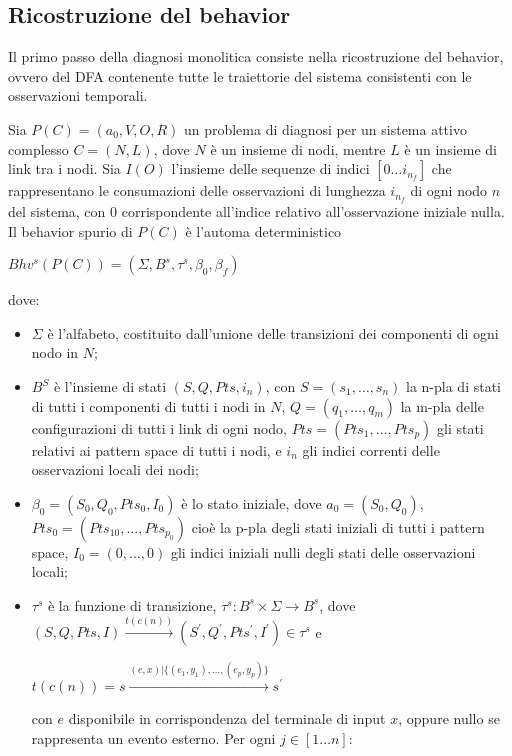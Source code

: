 \subsection{Ricostruzione del behavior}
Il primo passo della diagnosi monolitica consiste nella ricostruzione del behavior, ovvero del DFA contenente tutte le traiettorie del sistema consistenti con le osservazioni temporali.
\begin{defn}
Sia $P(C) = (a_0,V,O,R)$ un problema di diagnosi per un sistema attivo complesso $C = (N,L)$, dove $N$ è un insieme di nodi, mentre $L$ è un insieme di link tra i nodi. Sia $I(O)$ l'insieme delle sequenze di indici $[0 \ldots i_{n_f}]$ che rappresentano le consumazioni delle osservazioni di lunghezza $i_{n_f}$ di ogni nodo $n$ del sistema, con $0$ corrispondente all'indice relativo all'osservazione iniziale nulla. 
Il behavior spurio di $P(C)$ è l'automa deterministico
\begin{center}
	$Bhv^s(P(C)) = (\Sigma,B^s,\tau^s,\beta_0,\beta_f)$
\end{center}
dove:
\begin{itemize}
\item $\Sigma$ è l'alfabeto, costituito dall'unione delle transizioni dei componenti di ogni nodo in $N$;
\item $B^S$ è l'insieme di stati $(S,Q,Pts,i_n)$, con $S = (s_1,\ldots,s_n)$ la n-pla di stati di tutti i componenti di tutti i nodi in $N$, $Q = (q_1,\ldots,q_m)$ la m-pla delle configurazioni di tutti i link di ogni nodo, $Pts = (Pts_1,\ldots,Pts_p)$ gli stati relativi ai pattern space di tutti i nodi, e $i_n$ gli indici correnti delle osservazioni locali dei nodi;
\item $\beta_0 = (S_0,Q_0,Pts_0,I_0)$ è lo stato iniziale, dove $a_0 = (S_0,Q_0)$, $Pts_0 = (Pts_{10},\ldots,Pts_{p_0})$ cioè la p-pla degli stati iniziali di tutti i pattern space, $I_0 = (0,\ldots,0)$ gli indici iniziali nulli degli stati delle osservazioni locali;
\item $\tau^s$ è la funzione di transizione, $\tau^s: B^s \times \Sigma \rightarrow B^s$, dove $(S,Q,Pts,I) \xrightarrow{t(c(n))} (S^\prime,Q^\prime,Pts^\prime,I^\prime) \in \tau^s$ e 
\begin{center}
	$t(c(n)) = s \xrightarrow{(e,x) | \{(e_1,y_1), \ldots, (e_p,y_p)\}} s^\prime$
\end{center}
con $e$ disponibile in corrispondenza del terminale di input $x$, oppure nullo se rappresenta un evento esterno.
Per ogni $j \in [1 \ldots n]$:
\begin{center}

\end{center}
\end{itemize}
\end{defn}
